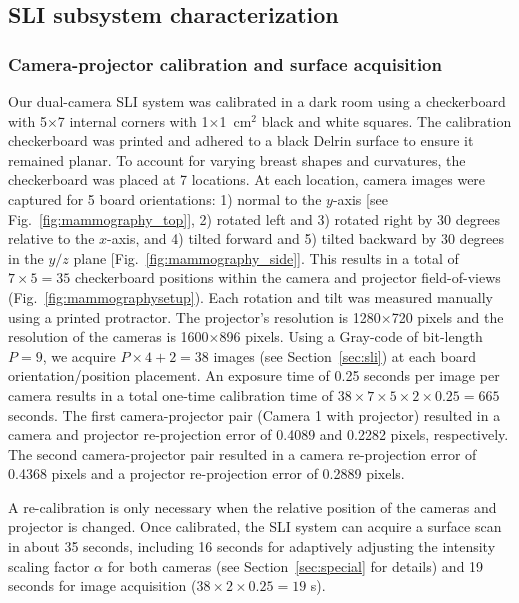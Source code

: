 \subsection{SLI subsystem characterization}


\subsubsection{Camera-projector calibration and surface acquisition}
\label{ssec:calibrationresults}
Our dual-camera SLI system was calibrated in a dark room using a checkerboard with 5$\times$7 internal corners with 1$\times$1~cm$^2$ black and white squares. The calibration checkerboard was printed and adhered to a black Delrin surface to ensure it remained planar. To account for varying breast shapes and curvatures, the checkerboard was placed at 7 locations. At each location, camera images were captured for 5 board orientations: 1) normal to the $y$-axis [see Fig.~\ref{fig:mammography_top}], 2) rotated left and 3) rotated right by 30 degrees relative to the $x$-axis, and 4) tilted forward and 5) tilted backward by 30 degrees in the $y/z$ plane [Fig.~\ref{fig:mammography_side}]. This results in a total of $7\times5=35$ checkerboard positions within the camera and projector field-of-views (Fig.~\ref{fig:mammographysetup}). Each rotation and tilt was measured manually using a printed protractor. The projector's resolution is 1280$\times$720 pixels and the resolution of the cameras is 1600$\times$896 pixels. Using a Gray-code of bit-length $P=9$, we acquire $P\times 4 + 2 = 38$ images (see Section~\ref{sec:sli}) at each board orientation/position placement. An exposure time of 0.25 seconds per image per camera results in a total one-time calibration time of $38 \times 7 \times 5 \times 2 \times 0.25 = 665$ seconds. The first camera-projector pair (Camera 1 with projector) resulted in a camera and projector re-projection error of 0.4089 and 0.2282 pixels, respectively. The second camera-projector pair resulted in a camera re-projection error of 0.4368 pixels and a projector re-projection error of 0.2889 pixels.

A re-calibration is only necessary when the relative position of the cameras and projector is changed. Once calibrated, the SLI system can acquire a surface scan in about 35 seconds, including 16 seconds for adaptively adjusting the intensity scaling factor $\alpha$ for both cameras (see Section~\ref{sec:special} for details) and 19 seconds for image acquisition ($38 \times 2\times 0.25 = 19$ s).

